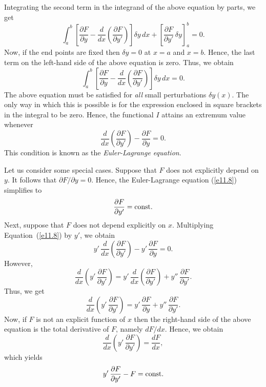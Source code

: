 Integrating the second term in the integrand of the above equation by
parts, we get
\begin{equation}
\int_a^b\left[\frac{\partial F}{\partial y}- \frac{d}{dx}\!\left(\frac{\partial F}{\partial y'}\right)\right]\delta y\,dx +\left[\frac{\partial F}{\partial y'}\,\delta y\right]_a^b=0.
\end{equation}
Now, if the end points  are fixed then $\delta y=0$ at
$x=a$ and $x=b$. Hence, the last term on the left-hand side of the
above equation is zero. Thus, we obtain
\begin{equation}
\int_a^b\left[\frac{\partial F}{\partial y}- \frac{d}{dx}\!\left(\frac{\partial F}{\partial y'}\right)\right]\delta y\,dx =0.
\end{equation}
The above equation must be satisfied for {\em all}\/ small  perturbations
$\delta y(x)$. The only way in which this is possible is for the
expression enclosed in square brackets in the integral to be zero. Hence, the functional
$I$ attains an extremum value whenever
\begin{equation}\label{e11.8}
\frac{d}{dx}\!\left(\frac{\partial F}{\partial y'}\right)-\frac{\partial F}{\partial y} = 0.
\end{equation}
This condition is known as the {\em Euler-Lagrange equation}.

Let us consider some special cases. Suppose that $F$ does not explicitly
depend on $y$. It follows that $\partial F/\partial y = 0$. Hence,
the Euler-Lagrange equation (\ref{e11.8}) simplifies to
\begin{equation}\label{e11.9}
\frac{\partial F}{\partial y'} = {\rm const}.
\end{equation}
Next, suppose that $F$ does not depend explicitly on $x$. Multiplying
Equation~(\ref{e11.8}) by $y'$, we obtain
\begin{equation}
y'\,\frac{d}{dx}\!\left(\frac{\partial F}{\partial y'}\right)-y'\,\frac{\partial F}{\partial y} = 0.
\end{equation}
However, 
\begin{equation}
\frac{d}{dx}\!\left(y'\,\frac{\partial F}{\partial y'}\right) = y'\,\frac{d}{dx}\!\left(\frac{\partial F}{\partial y'}\right)+ y''\,\frac{\partial F}{\partial y'}.
\end{equation}
Thus, we get
\begin{equation}
\frac{d}{dx}\!\left(y'\,\frac{\partial F}{\partial y'}\right) = y'\,\frac{\partial F}{\partial y} +  y''\,\frac{\partial F}{\partial y'}.
\end{equation}
Now, if $F$ is not an explicit function of $x$ then the right-hand side of
the above equation is the total derivative of $F$, namely $dF/dx$. 
Hence, we obtain
\begin{equation}
\frac{d}{dx}\!\left(y'\,\frac{\partial F}{\partial y'}\right) = \frac{dF}{dx},
\end{equation}
which yields
\begin{equation}\label{e11.14}
y'\,\frac{\partial F}{\partial y'} - F = {\rm const}.
\end{equation}

